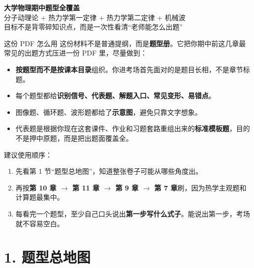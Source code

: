 \documentclass[11pt,a4paper]{ctexart}
\newcommand{\key}[1]{\textcolor{theme}{\textbf{#1}}}
\begin{document}
\begin{center}
{\bfseries 大学物理期中题型全覆盖\\[4pt]}
{分子动理论 + 热力学第一定律 + 热力学第二定律 + 机械波\\[10pt]}
{\large 目标不是背零碎知识点，而是一次性看清“老师能怎么出题”}
\end{center}

\vspace{4mm}

\begin{introbox}{这份 PDF 怎么用}
这份材料不是普通提纲，而是\key{题型册}。它把你期中前这几章最常见的出题方式压进一份 PDF 里，尽量做到：
\begin{itemize}
  \item \key{按题型而不是按课本目录}组织。你进考场首先面对的是题目长相，不是章节标题。
  \item 每个题型都给\key{识别信号、代表题、解题入口、常见变形、易错点}。
  \item 图像题、循环题、波形题都给了\key{示意图}，避免只靠文字想象。
  \item 代表题是根据你现在这套课件、作业和习题套路重组出来的\key{标准模板题}，目的不是押中原题，而是把出题面覆盖全。
\end{itemize}
建议使用顺序：
\begin{enumerate}
  \item 先看第 1 节“题型总地图”，知道整张卷子可能从哪些角度出。
  \item 再按\key{第 10 章 $\rightarrow$ 第 11 章 $\rightarrow$ 第 9 章 $\rightarrow$ 第 7 章}刷，因为热学主观题和计算题最集中。
  \item 每看完一个题型，至少自己口头说出\key{第一步写什么式子}。能说出第一步，考场就不容易空白。
\end{enumerate}
\end{introbox}

\section*{1. 题型总地图}
\end{document}
